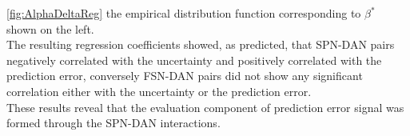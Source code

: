 \ref{fig:AlphaDeltaReg} the empirical distribution function corresponding to $\beta^*$ shown on the left.\\
The resulting regression coefficients showed, as predicted, that SPN-DAN pairs negatively correlated with the uncertainty and positively correlated with the prediction error, conversely FSN-DAN pairs did not show any significant correlation either with the uncertainty or the prediction error.\\These results reveal that the evaluation component of prediction error signal was formed through the SPN-DAN interactions. 
